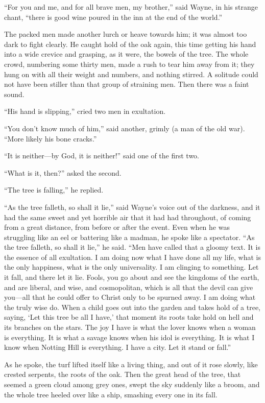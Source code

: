 \documentclass{book}
\begin{document}
“For you and me, and for all brave men, my brother,” said Wayne, in his strange chant, “there is good wine poured in the inn at the end of the world.”

The packed men made another lurch or heave towards him; it was almost too dark to fight clearly. He caught hold of the oak again, this time getting his hand into a wide crevice and grasping, as it were, the bowels of the tree. The whole crowd, numbering some thirty men, made a rush to tear him away from it; they hung on with all their weight and numbers, and nothing stirred. A solitude could not have been stiller than that group of straining men. Then there was a faint sound.

“His hand is slipping,” cried two men in exultation.

“You don’t know much of him,” said another, grimly (a man of the old war). “More likely his bone cracks.”

“It is neither—by God, it is neither!” said one of the first two.

“What is it, then?” asked the second.

“The tree is falling,” he replied.

“As the tree falleth, so shall it lie,” said Wayne’s voice out of the darkness, and it had the same sweet and yet horrible air that it had had throughout, of coming from a great distance, from before or after the event. Even when he was struggling like an eel or battering like a madman, he spoke like a spectator. “As the tree falleth, so shall it lie,” he said. “Men have called that a gloomy text. It is the essence of all exultation. I am doing now what I have done all my life, what is the only happiness, what is the only universality. I am clinging to something. Let it fall, and there let it lie. Fools, you go about and see the kingdoms of the earth, and are liberal, and wise, and cosmopolitan, which is all that the devil can give you—all that he could offer to Christ only to be spurned away. I am doing what the truly wise do. When a child goes out into the garden and takes hold of a tree, saying, ‘Let this tree be all I have,’ that moment its roots take hold on hell and its branches on the stars. The joy I have is what the lover knows when a woman is everything. It is what a savage knows when his idol is everything. It is what I know when Notting Hill is everything. I have a city. Let it stand or fall.”

As he spoke, the turf lifted itself like a living thing, and out of it rose slowly, like crested serpents, the roots of the oak. Then the great head of the tree, that seemed a green cloud among grey ones, swept the sky suddenly like a broom, and the whole tree heeled over like a ship, smashing every one in its fall.
\end{document}
